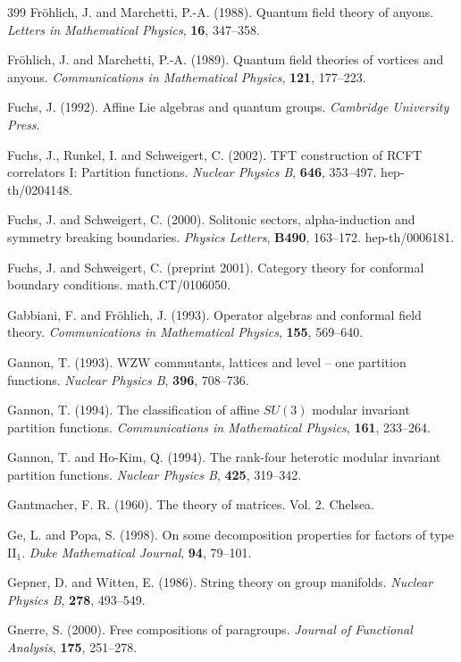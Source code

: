 \documentclass[12pt]{article}
\theoremstyle{plain}
\theoremstyle{definition}
\numberwithin{equation}{section}
\begin{document}
\begin{thebibliography} {399}
Fr\"ohlich, J. and Marchetti, P.-A. (1988).
Quantum field theory of anyons.
{\em Letters in Mathematical Physics}, {\bf 16}, 
347--358.

Fr\"ohlich, J. and Marchetti, P.-A. (1989).
Quantum field theories of vortices and anyons.
{\em Communications in Mathematical Physics}, {\bf 121}, 177--223.

Fuchs, J. (1992).
Affine Lie algebras and quantum groups.
{\em Cambridge University Press}.

Fuchs, J., Runkel, I. and Schweigert, C. (2002).
TFT construction of RCFT correlators I: Partition functions.
{\em Nuclear Physics B}, {\bf 646}, 353--497.
hep-th/0204148.

Fuchs, J. and Schweigert, C. (2000).
Solitonic sectors, alpha-induction and symmetry breaking boundaries.
{\em Physics Letters}, {\bf B490}, 163--172.
hep-th/0006181.

Fuchs, J. and Schweigert, C. (preprint 2001).
Category theory for conformal boundary conditions. 
math.CT/0106050.

Gabbiani, F. and Fr\"ohlich, J. (1993).
Operator algebras and conformal field theory.
{\em Communications in Mathematical Physics}, {\bf 155},  569--640.

Gannon, T. (1993).
WZW commutants, lattices and level -- one partition functions.
{\em Nuclear Physics B}, {\bf 396}, 708--736.

Gannon, T. (1994).
The classification of affine $SU(3)$ modular invariant
partition functions.
{\em Communications in Mathematical Physics},
{\bf 161}, 233--264.

Gannon, T. and Ho-Kim, Q. (1994).
The rank-four heterotic modular invariant partition functions.
{\em Nuclear Physics B}, {\bf 425}, 319--342.

Gantmacher, F. R. (1960).
The theory of matrices. Vol. 2.
Chelsea.

Ge, L. and Popa, S. (1998).
On some decomposition properties for factors of type II$_1$.
{\em Duke Mathematical Journal}, {\bf 94}, 79--101.

Gepner, D. and Witten, E. (1986).
String theory on group manifolds.
{\em Nuclear Physics B}, {\bf 278}, 493--549.

Gnerre, S. (2000).
Free compositions of paragroups.
{\em Journal of Functional Analysis}, {\bf 175}, 251--278.


\end{thebibliography}
\end{document}
